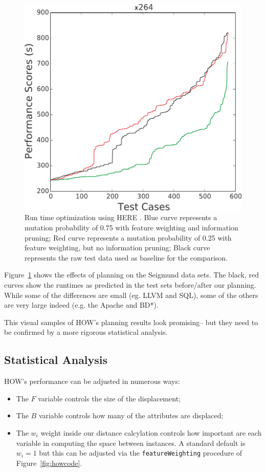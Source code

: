 \documentclass[conference]{IEEEtran}
\newcommand{\bi}{\begin{itemize}}
\newcommand{\ei}{\end{itemize}}
\newcommand{\fig}[1]{Figure~\ref{fig:#1}}
\begin{document}
\begin{figure}[htbp!]
\begin{minipage}{0.30\linewidth}
\end{minipage}
\begin{minipage}{0.30\linewidth}
\includegraphics[width=\linewidth]{_figs/X264.pdf}
\end{minipage}
\caption{Run time optimization using HERE . Blue curve represents a mutation probability of 0.75 with feature weighting and information pruning; Red curve represents a mutation probability of 0.25 with feature weighting, but no information pruning; Black curve represents the raw test data used as baseline for the comparison.}
\label{fig:pp}
\end{figure}

\fig{pp} shows the effects of planning on the Seigmund data sets. The black, red %
curves show the
runtimes as predicted in the test sets before/after our planning.  While some of the differences
are small (eg. LLVM and SQL), some of the others are very large indeed (e.g. the Apache and   BD*).
 
This visual samples of HOW's planning results look promising-- but they need to be confirmed by a
 more rigorous statistical analysis.
 
\subsection{Statistical Analysis}

HOW's performance can be adjusted in numerous ways:
\bi
\item The $F$ variable controls the size of the displacement;
\item The $B$ variable controls how many of the attributes are displaced;
\item The $w_i$ weight inside our distance calcylation controls how important are each variable in computing
     the space between instances. A standard default is $w_i=1$ but this can be adjusted via
     the {\tt featureWeighting} procedure of \fig{howcode}.
\ei
\end{document}
